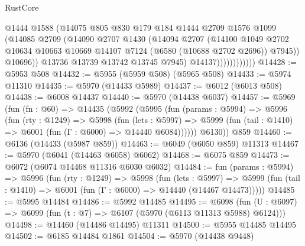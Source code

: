 \begin{lexlean}{RustCore}
\begin{coremodule}
{\begin{coremodule}
{{{{{{{{{{{{{{{{{{{{{{{{{{{{{{{{{{{{{{{{{{{{{                            @1444
                            @1588
                            (@14075
                              @805
                              @830
                              @179
                              @184
                              @1444
                              @2709
                              @1576
                              @1099
                              (@14085
                                @2709
                                (@14090
                                  @2707
                                  @1430
                                  (@14094
                                    @2707
                                    (@14100
                                      @1049
                                      @2702
                                      @10634
                                      @10663
                                      @10669
                                      @14107
                                      @7124
                                      (@6580 (@10688 @2702 @2696))
                                      @7945))
                                  @10696))
                              @13736
                              @13739
                              @13742
                              @13745
                              @7945)
                            @14137))))))))))))
@14428 := @5953 @508
@14432 := @5955 (@5959 @508) (@5965 @508)
@14433 := @5974 @11310
@14435 := @5970 (@14433 @5989)
@14437 := @6012 (@6013 @508)
@14438 := @6008 @14437
@14440 := @5970 (@14438 @6037)
@14457 := @5969
    (fun (fn : @60) =>
    @14435
      (@5992
        (@5995
          (fun (params : @5994) =>
          @5996
            (fun (rty : @1249) =>
            @5998
              (fun (lets : @5997) =>
              @5999 (fun (tail : @1410) => @6001 (fun (Γ : @6000) => @14440 @6084))))))
        @6130))
    @859
@14460 := @6136 (@14433 (@5987 @859))
@14463 := @6049 (@6050 @859) @11313
@14467 := @5970 (@6041 (@14463 @6058) @6062)
@14468 := @6075 @859
@14473 := @6072 (@6074 @14468 @11316 @6030 @6032)
@14484 := fun (params : @5994) =>
  @5996
    (fun (rty : @1249) =>
    @5998
      (fun (lets : @5997) =>
      @5999 (fun (tail : @1410) => @6001 (fun (Γ : @6000) => @14440 (@14467 @14473)))))
@14485 := @5995 @14484
@14486 := @5992 @14485
@14495 := @6098
    (fun (U : @6097) => @6099 (fun (t : @7) => @6107 (@5970 (@6113 @11313 @5988) @6124)))
@14498 := @14460 (@14486 @14495) @11311
@14500 := @5955 @14485 @14495
@14502 := @6185 @14484 @1861
@14504 := @5970 (@14438 @9448)
}}}}}}}}}}}}}}}}}}}}}}}}}}}}}}}}}}}}}}}}}}}}}
\end{coremodule}}
\end{coremodule}
\end{lexlean}
